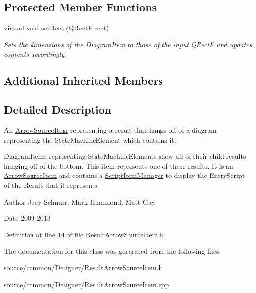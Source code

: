 \subsection*{Protected Member Functions}
\begin{DoxyCompactItemize}
\item 
\hypertarget{class_result_arrow_source_item_acab53fd892ad90d4bcd29772e9855b39}{virtual void \hyperlink{class_result_arrow_source_item_acab53fd892ad90d4bcd29772e9855b39}{set\-Rect} (Q\-Rect\-F rect)}\label{class_result_arrow_source_item_acab53fd892ad90d4bcd29772e9855b39}

\begin{DoxyCompactList}\small\item\em Sets the dimensions of the \hyperlink{class_diagram_item}{Diagram\-Item} to those of the input Q\-Rect\-F and updates contents accordingly. \end{DoxyCompactList}\end{DoxyCompactItemize}
\subsection*{Additional Inherited Members}


\subsection{Detailed Description}
An \hyperlink{class_arrow_source_item}{Arrow\-Source\-Item} representing a result that hangs off of a diagram representing the State\-Machine\-Element which contains it. 

Diagram\-Items representing State\-Machine\-Elements show all of their child results hanging off of the bottom. This item represents one of these results. It is an \hyperlink{class_arrow_source_item}{Arrow\-Source\-Item} and contains a \hyperlink{class_script_item_manager}{Script\-Item\-Manager} to display the Entry\-Script of the Result that it represents. \begin{DoxyAuthor}{Author}
Joey Schnurr, Mark Hammond, Matt Gay 
\end{DoxyAuthor}
\begin{DoxyDate}{Date}
2009-\/2013 
\end{DoxyDate}


Definition at line 14 of file Result\-Arrow\-Source\-Item.\-h.



The documentation for this class was generated from the following files\-:\begin{DoxyCompactItemize}
\item 
source/common/\-Designer/Result\-Arrow\-Source\-Item.\-h\item 
source/common/\-Designer/Result\-Arrow\-Source\-Item.\-cpp\end{DoxyCompactItemize}
